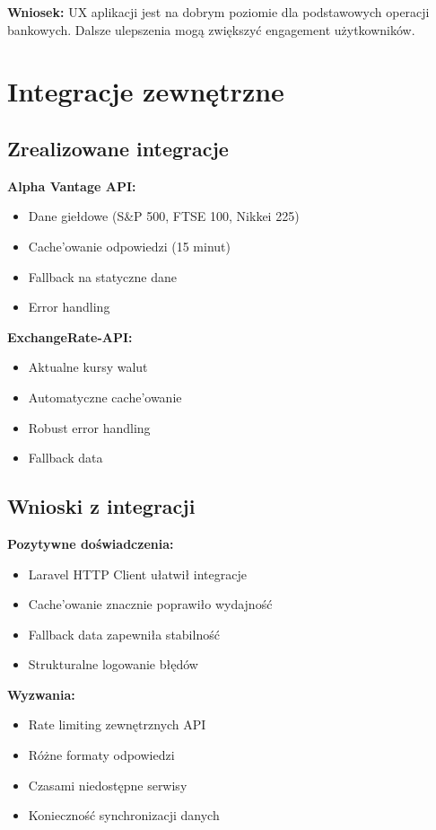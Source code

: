\documentclass[12pt,a4paper]{article}
\begin{document}
    \textbf{Wniosek:} UX aplikacji jest na dobrym poziomie dla podstawowych operacji bankowych. Dalsze ulepszenia mogą zwiększyć engagement użytkowników.

    \section{Integracje zewnętrzne}

    \subsection{Zrealizowane integracje}

    \textbf{Alpha Vantage API:}
    \begin{itemize}
        \item Dane giełdowe (S\&P 500, FTSE 100, Nikkei 225)
        \item Cache'owanie odpowiedzi (15 minut)
        \item Fallback na statyczne dane
        \item Error handling
    \end{itemize}

    \textbf{ExchangeRate-API:}
    \begin{itemize}
        \item Aktualne kursy walut
        \item Automatyczne cache'owanie
        \item Robust error handling
        \item Fallback data
    \end{itemize}

    \subsection{Wnioski z integracji}

    \textbf{Pozytywne doświadczenia:}
    \begin{itemize}
        \item Laravel HTTP Client ułatwił integracje
        \item Cache'owanie znacznie poprawiło wydajność
        \item Fallback data zapewniła stabilność
        \item Strukturalne logowanie błędów
    \end{itemize}

    \textbf{Wyzwania:}
    \begin{itemize}
        \item Rate limiting zewnętrznych API
        \item Różne formaty odpowiedzi
        \item Czasami niedostępne serwisy
        \item Konieczność synchronizacji danych
    \end{itemize}
\end{document}
